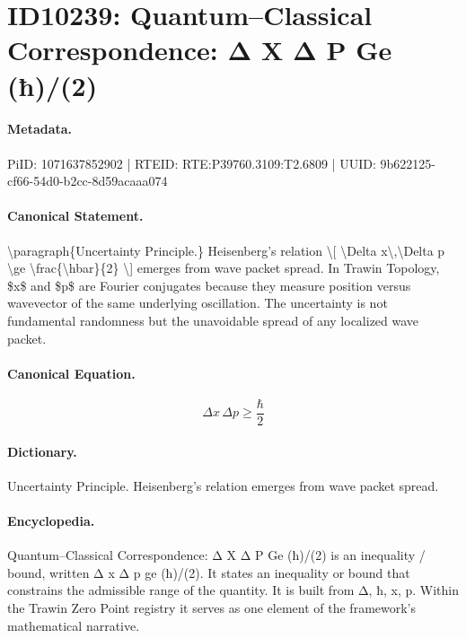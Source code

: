 \section*{ID10239: Quantum–Classical Correspondence: Δ X Δ P Ge (ħ)/(2)}
\paragraph{Metadata.}
PiID: 1071637852902 | RTEID: RTE:P39760.3109:T2.6809 | UUID: 9b622125-cf66-54d0-b2cc-8d59acaaa074

\paragraph{Canonical Statement.}
\textbackslash{}paragraph\{Uncertainty Principle.\} Heisenberg's relation \textbackslash{}[ \textbackslash{}Delta x\textbackslash{},\textbackslash{}Delta p \textbackslash{}ge \textbackslash{}frac\{\textbackslash{}hbar\}\{2\} \textbackslash{}] emerges from wave packet spread. In Trawin Topology, \$x\$ and \$p\$ are Fourier conjugates because they measure position versus wavevector of the same underlying oscillation. The uncertainty is not fundamental randomness but the unavoidable spread of any localized wave packet.

\paragraph{Canonical Equation.}
\[
\Delta x\,\Delta p \ge \frac{\hbar}{2}
\]

\paragraph{Dictionary.}
Uncertainty Principle. Heisenberg's relation emerges from wave packet spread.

\paragraph{Encyclopedia.}
Quantum–Classical Correspondence: Δ X Δ P Ge (ħ)/(2) is an inequality / bound, written Δ x Δ p ge (ħ)/(2). It states an inequality or bound that constrains the admissible range of the quantity. It is built from Δ, ħ, x, p. Within the Trawin Zero Point registry it serves as one element of the framework's mathematical narrative.
